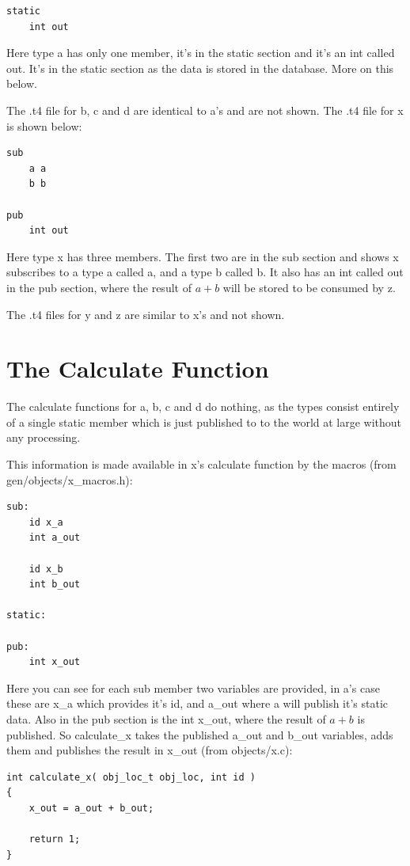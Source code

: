 \documentclass{report}
\begin{document}
\begin{verbatim}
static
    int out
\end{verbatim}

Here type a has only one member, it's in the static section and it's an int called out. It's in the static section as the data is stored in the database. More on this below.

The .t4 file for b, c and d are identical to a's and are not shown. The .t4 file for x is shown below:

\begin{verbatim}
sub
    a a
    b b

pub 
    int out
\end{verbatim}

Here type x has three members. The first two are in the sub section and shows x subscribes to a type a called a, and a type b called b. It also has an int called out in the pub section, where the result of \(a + b\) will be stored to be consumed by z.

The .t4 files for y and z are similar to x's and not shown.

\section{The Calculate Function}

The calculate functions for a, b, c and d do nothing, as the types consist entirely of a single static member which is just published to to the world at large without any processing. 

This information is made available in x's calculate function by the macros (from gen/objects/x_macros.h):

\begin{verbatim}
sub:
    id x_a
    int a_out

    id x_b
    int b_out

static:

pub:
    int x_out
\end{verbatim}

Here you can see for each sub member two variables are provided, in a's case these are x_a which provides it's id, and a_out where a will publish it's static data. Also in the pub section is the int x_out, where the result of  \(a + b\) is published. So calculate_x takes the published a_out and b_out variables, adds them and publishes the result in x_out (from objects/x.c):

\begin{verbatim}
int calculate_x( obj_loc_t obj_loc, int id )
{
    x_out = a_out + b_out;

    return 1;
}
\end{verbatim}
\end{document}
